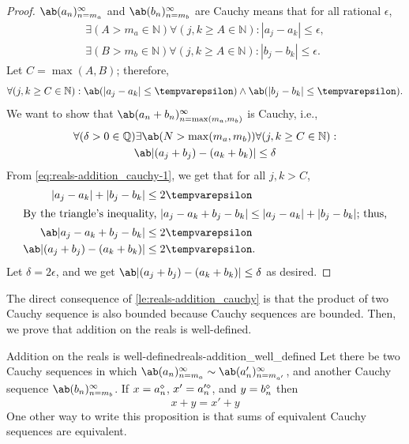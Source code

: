 \begin{proof}
  $\sequence{a_n}{n = m_a}{\infty}$ and $\sequence{b_n}{n = m_b}{\infty}$ are Cauchy
  means that for all rational $\epsilon$,
  \begin{gather}
    \exists (A > m_a \in \mathbb{N}) \forall (j, k \geq A \in \mathbb{N}) : |a_j - a_k| \leq \epsilon, \\
    \exists (B > m_b \in \mathbb{N}) \forall (j, k \geq A \in \mathbb{N}) : |b_j - b_k| \leq \epsilon.
  \end{gather}
  Let $C = \max(A, B)$; therefore,
  \begin{equation}
    \forall (j, k \geq C \in \mathbb{N}) : \ab(|a_j - a_k| \leq \epsilon)
    \land \ab(|b_j - b_k| \leq \epsilon). \label{eq:reals-addition_cauchy-1}
  \end{equation}
  We want to show that $\sequence{a_n + b_n}{n = \max(m_a, m_b)}{\infty}$ is Cauchy, i.e.,
  \begin{multline}
    \forall (\delta > 0 \in \mathbb{Q}) \exists \ab(N > \max(m_a, m_b)) \forall (j, k \geq C \in \mathbb{N}) : \\
    \ab|(a_j + b_j) - (a_k + b_k)| \leq \delta
  \end{multline}
  From \cref{eq:reals-addition_cauchy-1}, we get that for all $j, k > C$,
  \begin{align}
    |a_j - a_k| + |b_j - b_k|      & \leq 2\epsilon  \\
    \shortintertext{By the triangle's inequality,  $|a_j - a_k + b_j - b_k| \leq |a_j - a_k| + |b_j - b_k|$; thus,}
    \ab|a_j - a_k + b_j - b_k|     & \leq 2\epsilon  \\
    \ab|(a_j + b_j) - (a_k + b_k)| & \leq 2\epsilon.
  \end{align}
  Let $\delta = 2\epsilon$, and we get $\ab|(a_j + b_j) - (a_k + b_k)| \leq \delta$ as desired.
\end{proof}
The direct consequence of \cref{le:reals-addition_cauchy} is that the product of two
Cauchy sequence is also bounded because Cauchy sequences are bounded. Then, we prove
that addition on the reals is well-defined.

\begin{prop}{Addition on the reals is well-defined}{reals-addition_well_defined}
  Let there be two Cauchy sequences in which
  $\sequence{a_n}{n = m_a}{\infty} \sim \sequence{a_n'}{n = m_{a'}}{\infty}$, and
  another Cauchy sequence $\sequence{b_n}{n = m_b}{\infty}$. If $x = a_n^{\diamond}$,
  $x' = a_n'^{\diamond}$, and $y = b_n^{\diamond}$ then
  \begin{equation}
    x + y = x' + y
  \end{equation}
  One other way to write this proposition is that sums of equivalent Cauchy sequences
  are equivalent.
\end{prop}

